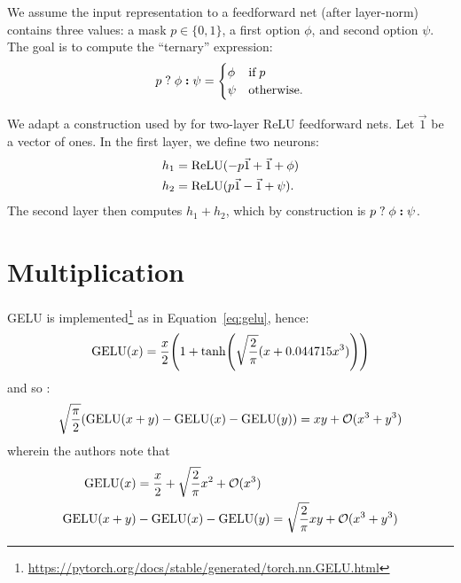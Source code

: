     We assume the input representation to a feedforward net (after layer-norm) contains three values: a mask $p \in \{0, 1\}$, a first option $\phi$, and second option $\psi$. The goal is to compute the ``ternary'' expression:
    \begin{equation*}
        p\;\mathbf{?}\; \phi\; \textbf{:} \;\psi =
        \begin{cases}
            \phi & \textrm{if} \; p \\
            \psi & \textrm{otherwise.}
        \end{cases}
    \end{equation*}

    We adapt a construction used by \citet[Theorem 1]{merrill-sabharwal-2024-cot} for two-layer ReLU feedforward nets.
    Let $\vec 1$ be a vector of ones.
    In the first layer, we define two neurons:
    \begin{align*}
        h_1 &= \text{ReLU}(-p \vec 1 + \vec 1 + \phi) \\
        h_2 &= \text{ReLU}(p \vec 1 - \vec 1 + \psi) .
    \end{align*}
    The second layer then computes $h_1 + h_2$, which by construction is $p\;\mathbf{?}\; \phi\; \textbf{:} \;\psi$.

\section{Multiplication}
\label{sec:ffnn_multiplication}

GELU is implemented\footnote{\url{https://pytorch.org/docs/stable/generated/torch.nn.GELU.html}} as in Equation~\eqref{eq:gelu}, hence:
\begin{align*}
    \GELU(x) = \frac{x}{2} \parens*{1 + \tanh\parens*{\sqrt{\frac{2}{\pi}} (x + 0.044715x^3)}}
\end{align*}
and so \citep[Lemma 4]{akyurek2022learning}:
\begin{align*}
    \sqrt{\frac{\pi}{2}}
    (\text{GELU}(x + y) - \text{GELU}(x) - \text{GELU}(y))
    = xy + \mathcal{O}(x^3 + y^3)
\end{align*}
wherein the authors note that
\begin{align*}
    \text{GELU}(x) &= \frac{x}{2} + \sqrt{\frac{2}{\pi}}x^2 + \mathcal{O}(x^3) \\
    \text{GELU}(x + y) &- \text{GELU}(x) - \text{GELU}(y) = \sqrt{\frac{2}{\pi}} xy + \mathcal{O}(x^3 + y^3)
\end{align*}

